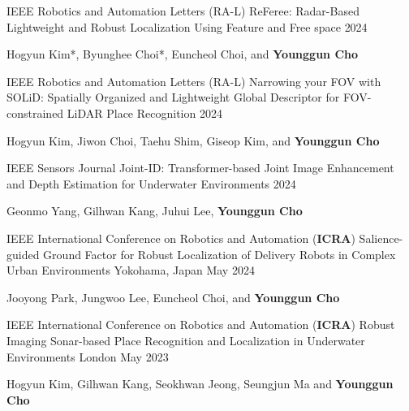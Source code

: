 \begin{cventries}
  \cventry
    {IEEE Robotics and Automation Letters (RA-L)} %
    {ReFeree: Radar-Based Lightweight and Robust Localization Using Feature and Free space} %
    {} %
    {2024} %
    {
      \begin{cvitems} %
        \item {Hogyun Kim*, Byunghee Choi*, Euncheol Choi, and \textbf{Younggun Cho}}
      \end{cvitems}
    }

  \cventry
    {IEEE Robotics and Automation Letters (RA-L)} %
    {Narrowing your FOV with SOLiD: Spatially Organized and Lightweight Global Descriptor for FOV-constrained LiDAR Place Recognition} %
    {} %
    {2024} %
    {
      \begin{cvitems} %
        \item {Hogyun Kim, Jiwon Choi, Taehu Shim, Giseop Kim, and \textbf{Younggun Cho}}
      \end{cvitems}
    }


  \cventry
    {IEEE Sensors Journal} %
    {Joint-ID: Transformer-based Joint Image Enhancement and Depth Estimation for Underwater Environments} %
    { } %
    {2024} %
    {
      \begin{cvitems} %
        \item {Geonmo Yang, Gilhwan Kang, Juhui Lee, \textbf{Younggun Cho}}
      \end{cvitems}
    }

  \cventry
    {IEEE International Conference on Robotics and Automation (\textbf{ICRA})} %
    {Salience-guided Ground Factor for Robust Localization of Delivery Robots in Complex Urban Environments} %
    {Yokohama, Japan} %
    {May 2024} %
    {
      \begin{cvitems} %
        \item {Jooyong Park, Jungwoo Lee, Euncheol Choi, and \textbf{Younggun Cho}}
      \end{cvitems}
    }
    

  \cventry
    {IEEE International Conference on Robotics and Automation (\textbf{ICRA})} %
    {Robust Imaging Sonar-based Place Recognition and Localization in Underwater Environments} %
    {London} %
    {May 2023} %
    {
      \begin{cvitems} %
        \item {Hogyun Kim, Gilhwan Kang, Seokhwan Jeong, Seungjun Ma and \textbf{Younggun Cho}}
      \end{cvitems}
    }



\end{cventries}
